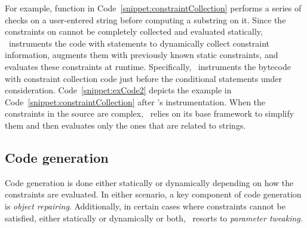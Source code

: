 \begin{mylist}
For example, function  in Code~\ref{snippet:constraintCollection}
performs a series of checks on a user-entered string  before computing
a substring on it. Since the constraints on  cannot be completely
collected and evaluated statically, \tool\ instruments the code with statements
to dynamically collect constraint information, augments them with previously
known static constraints, and evaluates these constraints at runtime.
Specifically, \tool\ instruments the bytecode with constraint collection code
just before the conditional statements under consideration.
Code~\ref{snippet:exCode2} depicts the example in
Code~\ref{snippet:constraintCollection} after \tool's instrumentation. When the
constraints in the source are complex, \tool\ relies on its base framework to
simplify them and then evaluates only the ones that are related to strings.

\end{mylist}

\subsection{Code generation}
\label{sec:tool:stage2:generation}

Code generation is done either statically or dynamically depending on how
the constraints are evaluated. In either scenario, a key component of code
generation is \textit{object repairing}. Additionally, in certain cases
where constraints cannot be satisfied, either statically or dynamically or
both, \tool\ resorts to \textit{parameter tweaking}.

